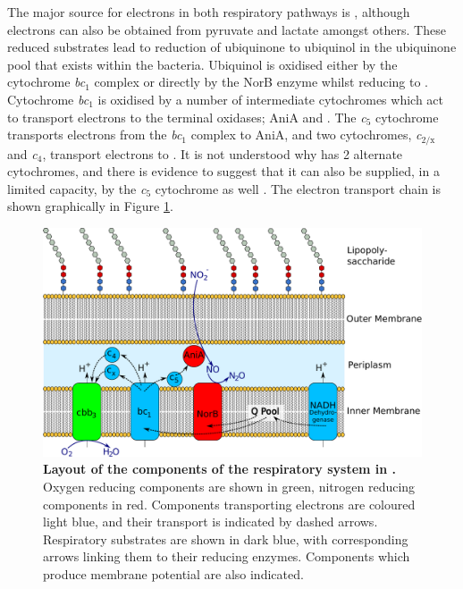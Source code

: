 The major source for electrons in both respiratory pathways is , although electrons can also be obtained from pyruvate and lactate amongst others. These reduced substrates lead to reduction of ubiquinone to ubiquinol in the ubiquinone pool that exists within the bacteria. Ubiquinol is oxidised either by the cytochrome \textit{bc$_{\textrm{1}}$} complex or directly by the NorB enzyme whilst reducing \cNO\space to \cNtwoO. Cytochrome \textit{bc$_{\textrm{1}}$} is oxidised by a number of intermediate cytochromes which act to transport electrons to the terminal oxidases; AniA and \cbbthree. The \textit{c$_{\textrm{5}}$} cytochrome transports electrons from the \textit{bc$_{\textrm{1}}$} complex to AniA, and two cytochromes, \textit{c$_{\textrm{2/x}}$} and \textit{c$_{\textrm{4}}$}, transport electrons to \cbbthree. It is not understood why \cbbthree{} has 2 alternate cytochromes, and there is evidence to suggest that it can also be supplied, in a limited capacity, by the \textit{c$_{\textrm{5}}$} cytochrome as well \cite{Deeudom2008}. The electron transport chain is shown graphically in Figure \ref{fig:etc}.

\begin{figure}
 \begin{center}
 \includegraphics[width=14cm]{./01-introduction/data/Respiratory_layout.pdf}
\end{center}
\caption{\footnotesize {\bf Layout of the components of the respiratory system in \Nsm.} Oxygen reducing components are shown in green, nitrogen reducing components in red. Components transporting electrons are coloured light blue, and their transport is indicated by dashed arrows. Respiratory substrates are shown in dark blue, with corresponding arrows linking them to their reducing enzymes. Components which produce membrane potential are also indicated.
\label{fig:etc}}
\end{figure}

